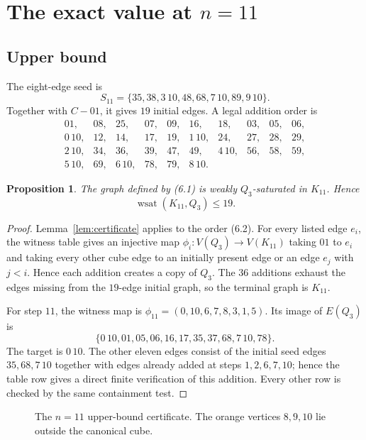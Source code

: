 \documentclass[11pt]{article}
\numberwithin{equation}{section}
\newtheorem{proposition}[theorem]{Proposition}
\newcommand{\wsat}{\operatorname{wsat}}
\begin{document}
\section{\texorpdfstring{The exact value at $n=11$}{The exact value at n=11}}\label{sec:n11}

\subsection{Upper bound}
The eight-edge seed is
\[
S_{11}=\{35,38,3\,10,48,68,7\,10,89,9\,10\}.
\tag{6.1}
\]
Together with $C-01$, it gives $19$ initial edges. A legal addition order is
\[
\begin{array}{cccccccccc}
01,&08,&25,&07,&09,&16,&18,&03,&05,&06,\\
0\,10,&12,&14,&17,&19,&1\,10,&24,&27,&28,&29,\\
2\,10,&34,&36,&39,&47,&49,&4\,10,&56,&58,&59,\\
5\,10,&69,&6\,10,&78,&79,&8\,10.
\end{array}
\tag{6.2}
\]

\begin{proposition}\label{prop:n11upper}
The graph defined by (6.1) is weakly $Q_3$-saturated in $K_{11}$. Hence
\[
\wsat(K_{11},Q_3)\le19.
\]
\end{proposition}

\begin{proof}
Lemma~\ref{lem:certificate} applies to the order (6.2). For every listed edge $e_i$, the witness table gives an injective map $\phi_i:V(Q_3)\to V(K_{11})$ taking $01$ to $e_i$ and taking every other cube edge to an initially present edge or an edge $e_j$ with $j<i$. Hence each addition creates a copy of $Q_3$. The $36$ additions exhaust the edges missing from the $19$-edge initial graph, so the terminal graph is $K_{11}$.

For step $11$, the witness map is
$\phi_{11}=(0,10,6,7,8,3,1,5)$. Its image of $E(Q_3)$ is
\[
\{0\,10,01,05,06,16,17,35,37,68,7\,10,78\}.
\]
The target is $0\,10$. The other eleven edges consist of the initial seed
edges $35,68,7\,10$ together with edges already added at steps
$1,2,6,7,10$; hence the table row gives a direct finite verification of this
addition. Every other row is checked by the same containment test.
\end{proof}

\begin{figure}[t]
\centering
\resizebox{0.72\linewidth}{!}{}
\caption{The $n=11$ upper-bound certificate. The orange vertices $8,9,10$ lie outside the canonical cube.}
\label{fig:n11seed}
\end{figure}
\end{document}
